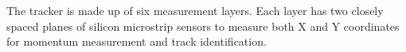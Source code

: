 \documentclass[b1]{sciposter}
\begin{document}
\begin{multicols}{3}



	The tracker is made up of six measurement layers. %
	Each layer has two closely spaced planes of silicon microstrip sensors to measure both X and Y coordinates for momentum measurement and track identification. %




\end{multicols}
\end{document}
